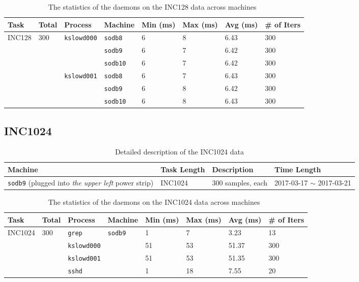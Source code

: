 \documentclass[10pt]{article}
\begin{document}
\begin{table}[H]
\centering
{\small
 \begin{tabular}{|l|l|l|l|l||l|l|l|} \hline
 Task & Total & Process & Machine & Min (ms) & Max (ms) & Avg (ms) & \# of Iters\\ \hline
 INC128 &  300 & {\tt kslowd000} & {\tt sodb8} & 6 & 8 & 6.43 & 300 \\ \hline
 &   &  & {\tt sodb9} & 6 & 7 & 6.42 & 300 \\ \hline
 &   &  & {\tt sodb10} & 6 & 7 & 6.42 & 300 \\ \hline 
 \hline
  &  & {\tt kslowd001} & {\tt sodb8} & 6 & 7 & 6.43 & 300 \\ \hline
 &   &  & {\tt sodb9} & 6 & 8 & 6.42 & 300 \\ \hline
 &   &  & {\tt sodb10} & 6 & 8 & 6.43 & 300 \\ \hline 
 \end{tabular}
  }
 \caption{The statistics of the daemons on the INC128 data across machines~\label{tab:inc128}}
\end{table}

\clearpage
\newpage
\subsection{INC1024} 

\begin{table}[h]
\begin{center}
\begin{tabular}{|p{4cm}|p{3cm}|p{4cm}|p{4cm}|} \hline
Machine & Task Length & Description & Time Length\\ \hline
{\tt sodb9} (plugged into {\em the upper left} power strip) & INC1024 & 300 samples, each & 2017-03-17 $\sim$ 2017-03-21  \\ \hline
\end{tabular}
\end{center}
\vspace{-.2in}
\caption{Detailed description of the INC1024 data \label{tab:exp_notes1024}}
\end{table}

\begin{table}[htp!]
\centering
{\small
 \begin{tabular}{|l|l|l|l|l||l|l|l|} \hline
 Task & Total & Process & Machine & Min (ms) & Max (ms) & Avg (ms) & \# of Iters\\ \hline
 INC1024 &  300 & {\tt grep} & {\tt sodb9} & 1 & 7 & 3.23 & 13 \\ \hline
 \hline
  &   & {\tt kslowd000} &  & 51 & 53 & 51.37 & 300 \\ \hline
 \hline
  &  & {\tt kslowd001} &  & 51 & 53 & 51.35 & 300 \\ \hline
 \hline
  &  & {\tt sshd} & & 1 & 18 & 7.55 & 20 \\ \hline
 \end{tabular}
  }
 \caption{The statistics of the daemons on the INC1024 data across machines~\label{tab:inc1024}}
\end{table}
\end{document}
